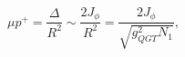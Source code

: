 \begin{equation}
\mu p^+ = \frac{\Delta}{R^2} \sim \frac{2 J_\phi}{R^2} = \frac{2 J_\phi}{\sqrt{g^2_{QGT} N_1}},
\end{equation} 
